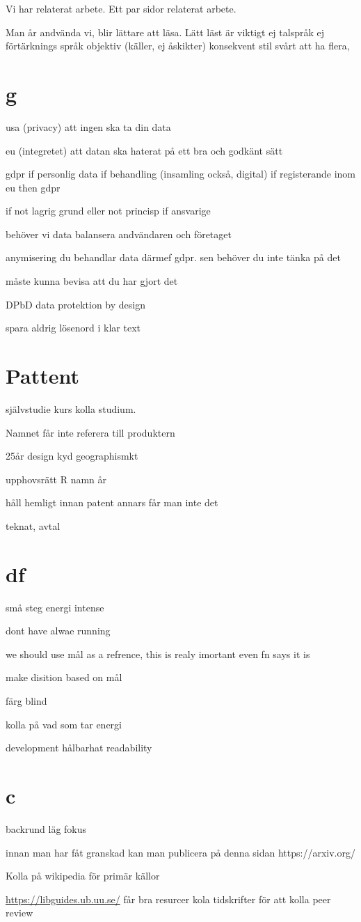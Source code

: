 Vi har relaterat arbete. Ett par sidor relaterat arbete.

Man år andvända vi, blir lättare att läsa. Lätt läst är viktigt
ej talspråk
ej förtärknings språk
objektiv (käller, ej åskikter)
konsekvent stil svårt att ha flera,

\section{g}
usa (privacy)
att ingen ska ta din data 

eu (integretet)
att datan ska haterat på ett bra och godkänt sätt

gdpr 
if personlig data
if behandling (insamling också, digital)
if registerande inom eu
then gdpr

if not lagrig grund
eller not princisp
    if ansvarige
    
behöver vi data
balansera andvändaren och företaget

anymisering du behandlar data därmef gdpr. sen behöver du inte tänka på det

måste kunna bevisa att du har gjort det

DPbD data protektion by design

spara aldrig lösenord i klar text

\section{Pattent}
självstudie kurs kolla studium.

Namnet får inte referera till produktern

25år design kyd geographismkt

upphovsrätt R namn år

håll hemligt innan patent annars får man inte det

teknat, avtal

\section{df}
små steg energi intense

dont have alwae running

we should use mål as a refrence, this is realy imortant even fn says it is

make disition based on mål

färg blind

kolla på vad som tar energi

development hålbarhat
readability

\section{c}

backrund läg fokus

innan man har fåt granskad kan man publicera på denna sidan https://arxiv.org/

Kolla på wikipedia för primär källor

\url{https://libguides.ub.uu.se/}  får bra resurcer
kola tidskrifter för att kolla peer review
